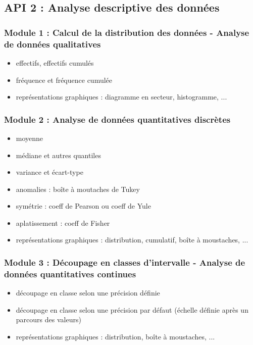 				
		\subsection{API 2 : Analyse descriptive des données}
				\subsubsection{Module 1 : Calcul de la distribution des données - Analyse de données qualitatives}
					\begin{itemize}
					\item effectifs, effectifs cumulés
					\item fréquence et fréquence cumulée
					\item représentations graphiques : diagramme en secteur, histogramme, ...
					\end{itemize}
				\subsubsection{Module 2 : Analyse de données quantitatives discrètes}
					\begin{itemize}
					\item moyenne
					\item médiane et autres quantiles
					\item variance et écart-type
					\item anomalies : boîte à moutaches de Tukey
					\item symétrie : coeff de Pearson ou coeff de Yule
					\item aplatissement : coeff de Fisher
					\item représentations graphiques : distribution, cumulatif,  boîte à moustaches, ...
					\end{itemize}
				\subsubsection{Module 3 : Découpage en classes d'intervalle - Analyse de données quantitatives continues}
					\begin{itemize}
					\item découpage en classe selon une précision définie
					\item découpage en classe selon une précision par défaut (échelle définie après un parcours des valeurs)
					\item représentations graphiques : distribution, boîte à moustaches, ...
					\end{itemize}
					
